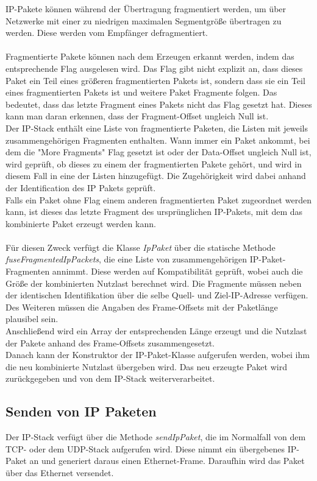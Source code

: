 IP-Pakete können während der Übertragung fragmentiert werden, um über Netzwerke mit einer zu niedrigen maximalen Segmentgröße übertragen zu werden. Diese werden vom Empfänger defragmentiert. \\\\
Fragmentierte Pakete können nach dem Erzeugen erkannt werden, indem das entsprechende Flag ausgelesen wird. Das Flag gibt nicht explizit an, dass dieses Paket ein Teil eines größeren fragmentierten Pakets ist, sondern dass sie ein Teil eines fragmentierten Pakets ist und weitere Paket Fragmente folgen. Das bedeutet, dass das letzte Fragment eines Pakets nicht das Flag gesetzt hat. Dieses kann man daran erkennen, dass der Fragment-Offset ungleich Null ist.\\
Der IP-Stack enthält eine Liste von fragmentierte Paketen, die Listen mit jeweils zusammengehörigen Fragmenten enthalten. Wann immer ein Paket ankommt, bei dem die {}"More Fragments"{} Flag gesetzt ist oder der Data-Offset ungleich Null ist, wird geprüft, ob dieses zu einem der fragmentierten Pakete gehört, und wird in diesem Fall in eine der Listen hinzugefügt. Die Zugehörigkeit wird dabei anhand der Identification des IP Pakets geprüft. \\
Falls ein Paket ohne Flag einem anderen fragmentierten Paket zugeordnet werden kann, ist dieses das letzte Fragment des ursprünglichen IP-Pakets, mit dem das kombinierte Paket erzeugt werden kann. \\\\
Für diesen Zweck verfügt die Klasse \textit{IpPaket} über die statische Methode \textit{fuseFragmentedIpPackets}, die eine Liste von zusammengehörigen IP-Paket-Fragmenten annimmt. Diese werden auf Kompatibilität geprüft, wobei auch die Größe der kombinierten Nutzlast berechnet wird. Die Fragmente müssen neben der identischen Identifikation über die selbe Quell- und Ziel-IP-Adresse verfügen. Des Weiteren müssen die Angaben des Frame-Offsets mit der Paketlänge plausibel sein. \\
Anschließend wird ein Array der entsprechenden Länge erzeugt und die Nutzlast der Pakete anhand des Frame-Offsets zusammengesetzt. \\Danach kann der Konstruktor der IP-Paket-Klasse aufgerufen werden, wobei ihm die neu kombinierte Nutzlast übergeben wird. Das neu erzeugte Paket wird zurückgegeben und von dem IP-Stack weiterverarbeitet. 


\subsection{Senden von IP Paketen}
Der IP-Stack verfügt über die Methode \textit{sendIpPaket}, die im Normalfall von dem TCP- oder dem UDP-Stack aufgerufen wird. Diese nimmt ein übergebenes IP-Paket an und generiert daraus einen Ethernet-Frame. Daraufhin wird das Paket über das Ethernet versendet. 


